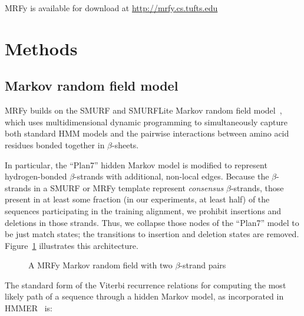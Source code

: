 \documentclass{acm_proc_article-sp}
\begin{document}
MRFy is available for download at \url{http://mrfy.cs.tufts.edu}

\section{Methods}

\subsection{Markov random field model}

MRFy builds on the SMURF and SMURFLite Markov random field 
model~\cite{Daniels:2012dg}, which uses multidimensional 
dynamic programming to simultaneously capture both standard HMM models and the
pairwise interactions between amino acid residues bonded together in
$\beta$-sheets. 

In particular, the ``Plan7'' hidden Markov model is modified to represent
hydrogen-bonded $\beta$-strands with additional, non-local edges.
Because the $\beta$-strands in a SMURF or MRFy template represent 
\emph{consensus} 
$\beta$-strands, those present in at least some fraction (in our experiments, 
at least
half) of the sequences participating in the training alignment, we prohibit
insertions and deletions in those strands.
Thus, we collapse those nodes of the ``Plan7'' model to be just match states;
the transitions to insertion and deletion states are removed.
Figure~\ref{mrfy_model} illustrates this architecture.


\begin{figure}[htb!]
\begin{center}
   \caption{A MRFy Markov random field with two $\beta$-strand pairs}
   \label{mrfy_model}
 \end{center}
\end{figure}

The standard form of the Viterbi
recurrence relations for computing the most likely path of a sequence through
a hidden Markov model, as incorporated in HMMER~\cite{Eddy:1998ut} is:
\end{document}
